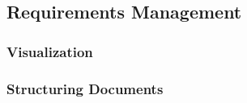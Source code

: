 \subsection{Requirements Management}

\subsubsection{Visualization}

\subsubsection{Structuring Documents}